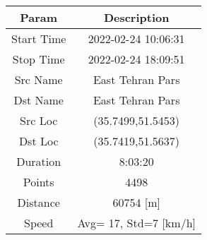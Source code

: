\begin{longtable*}{|c|c|}\hline
{}
Param&Description\\\hline\hline
{}Start Time&2022-02-24 10:06:31\\\hline
{}Stop Time&2022-02-24 18:09:51\\\hline
{}Src Name&East Tehran Pars\\\hline
{}Dst Name&East Tehran Pars\\\hline
{}Src Loc&(35.7499,51.5453)\\\hline
{}Dst Loc&(35.7419,51.5637)\\\hline
{}Duration&8:03:20\\\hline
{}Points&4498\\\hline
{}Distance&60754 [m]\\\hline
{}Speed&Avg= 17, Std=7 [km/h]\\\hline
\end{longtable*}
